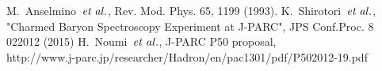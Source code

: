 \begin{thebibliography}{99}
   M.~Anselmino~${\it et\;al.}$, Rev. Mod. Phys. 65, 1199 (1993).
   K.~Shirotori~${\it et\;al.}$, "Charmed Baryon Spectroscopy Experiment at J-PARC", JPS Conf.Proc. 8 022012 (2015)
   H.~Noumi~${\it et\;al.}$, J-PARC P50 proposal, \\
  http://www.j-parc.jp/researcher/Hadron/en/pac1301/pdf/P502012-19.pdf
  
  
  
  
  
  
  
  
  
  

\end{thebibliography}
